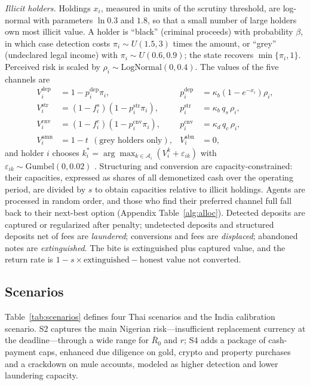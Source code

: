 \documentclass[11pt]{article}
\theoremstyle{definition}
\theoremstyle{remark}
\begin{document}
\textit{Illicit holders.} Holdings $x_i$, measured in units of the scrutiny threshold, are log-normal with
parameters $\ln 0.3$ and $1.8$, so that a small number of large holders own most illicit value. A holder is
``black'' (criminal proceeds) with probability $\beta$, in which case detection costs $\pi_i\sim U(1.5,3)$ times the amount,
or ``grey'' (undeclared legal income) with $\pi_i\sim U(0.6,0.9)$; the state recovers $\min\{\pi_i,1\}$. Perceived risk is
scaled by $\rho_i\sim\mathrm{LogNormal}(0,0.4)$. The values of the five channels are
\begin{equation}\label{eq:values}
\begin{aligned}
V_i^{\mathrm{dep}}&=1-p_i^{\mathrm{dep}}\pi_i, & p_i^{\mathrm{dep}}&=\kappa_b\left(1-e^{-x_i}\right)\rho_i,\\
V_i^{\mathrm{str}}&=(1-f_i^{s})\left(1-p_i^{\mathrm{str}}\pi_i\right), & p_i^{\mathrm{str}}&=\kappa_b\,q_s\,\rho_i,\\
V_i^{\mathrm{cnv}}&=(1-f_i^{c})\left(1-p_i^{\mathrm{cnv}}\pi_i\right), & p_i^{\mathrm{cnv}}&=\kappa_d\,q_c\,\rho_i,\\
V_i^{\mathrm{amn}}&=1-t\ \ (\text{grey holders only}), & V_i^{\mathrm{abn}}&=0,
\end{aligned}
\end{equation}
and holder $i$ chooses $k_i^*=\arg\max_{k\in\mathcal A_i}\left(V_i^k+\varepsilon_{ik}\right)$ with
$\varepsilon_{ik}\sim\mathrm{Gumbel}(0,0.02)$ \citep{mcfadden1974}. Structuring and conversion are capacity-constrained:
their capacities, expressed as shares of all demonetized cash over the operating period, are divided by $s$ to obtain
capacities relative to illicit holdings. Agents are processed in random order, and those who find their preferred channel
full fall back to their next-best option (Appendix Table~\ref{alg:alloc}). Detected deposits are captured or regularized after
penalty; undetected deposits and structured deposits net of fees are \textit{laundered}; conversions and fees are
\textit{displaced}; abandoned notes are \textit{extinguished}. The bite is extinguished plus captured value, and the return
rate is $1-s\times\text{extinguished}-\text{honest value not converted}$.

\subsection{Scenarios}
Table~\ref{tab:scenarios} defines four Thai scenarios and the India calibration scenario. S2 captures the main Nigerian
risk---insufficient replacement currency at the deadline---through a wide range for $\bar R_0$ and $r$; S4 adds a package of
cash-payment caps, enhanced due diligence on gold, crypto and property purchases and a crackdown on mule accounts, modeled as
higher detection and lower laundering capacity.
\end{document}
